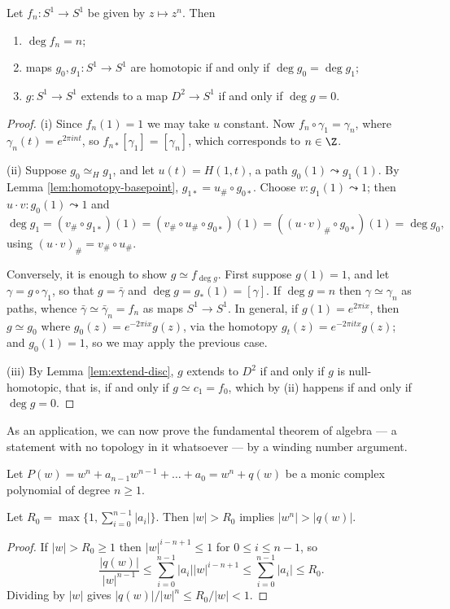 \begin{proposition} \label{prop:degree}
	Let $f_n: S^1 \to S^1$ be given by $z \mapsto z^n$. Then
	\begin{enumerate}
		\item $\deg f_n = n$;
		\item maps $g_0, g_1: S^1 \to S^1$ are homotopic if and only if $\deg g_0 = \deg g_1$;
		\item $g: S^1 \to S^1$ extends to a map $D^2 \to S^1$ if and only if $\deg g = 0$.
	\end{enumerate}
\end{proposition}
\begin{proof}
	(i) Since $f_n(1) = 1$ we may take $u$ constant. Now $f_n \circ \gamma_1 = \gamma_n$, where $\gamma_n(t) = e^{2\pi int}$, so $f_{n*}[\gamma_1] = [\gamma_n]$, which corresponds to $n \in \Z$.

	(ii) Suppose $g_0 \simeq_H g_1$, and let $u(t) = H(1,t)$, a path $g_0(1) \leadsto g_1(1)$. By Lemma \ref{lem:homotopy-basepoint}, $g_{1*} = u_\# \circ g_{0*}$. Choose $v: g_1(1) \leadsto 1$; then $u \cdot v : g_0(1) \leadsto 1$ and
	$$
	\deg g_1 = (v_\# \circ g_{1*})(1) = (v_\# \circ u_\# \circ g_{0*})(1) = ((u\cdot v)_\# \circ g_{0*})(1) = \deg g_0,
	$$
	using $(u \cdot v)_\# = v_\# \circ u_\#$.

	Conversely, it is enough to show $g \simeq f_{\deg g}$. First suppose $g(1) = 1$, and let $\gamma = g \circ \gamma_1$, so that $g = \bar\gamma$ and $\deg g = g_*(1) = [\gamma]$. If $\deg g = n$ then $\gamma \simeq \gamma_n$ as paths, whence $\bar\gamma \simeq \bar\gamma_n = f_n$ as maps $S^1 \to S^1$. In general, if $g(1) = e^{2\pi i x}$, then $g \simeq g_0$ where $g_0(z) = e^{-2\pi i x}g(z)$, via the homotopy $g_t(z) = e^{-2\pi i tx}g(z)$; and $g_0(1) = 1$, so we may apply the previous case.

	(iii) By Lemma \ref{lem:extend-disc}, $g$ extends to $D^2$ if and only if $g$ is null-homotopic, that is, if and only if $g \simeq c_{1} = f_0$, which by (ii) happens if and only if $\deg g = 0$.
\end{proof}

As an application, we can now prove the fundamental theorem of algebra --- a statement
with no topology in it whatsoever --- by a winding number argument.

Let $P(w) = w^n + a_{n-1}w^{n-1} + \dots + a_0 = w^n + q(w)$ be a monic complex polynomial
of degree $n \geq 1$.

\begin{lemma} \label{lem:fta-bound}
	Let $R_0 = \max\{1, \sum_{i=0}^{n-1}|a_i|\}$. Then $|w| > R_0$ implies $|w^n| > |q(w)|$.
\end{lemma}
\begin{proof}
	If $|w| > R_0 \geq 1$ then $|w|^{i - n + 1} \leq 1$ for $0 \leq i \leq n-1$, so
	$$
	\frac{|q(w)|}{|w|^{n-1}} \leq \sum_{i=0}^{n-1} |a_i| |w|^{i-n+1} \leq \sum_{i=0}^{n-1}|a_i| \leq R_0.
	$$
	Dividing by $|w|$ gives $|q(w)|/|w|^n \leq R_0/|w| < 1$.
\end{proof}

